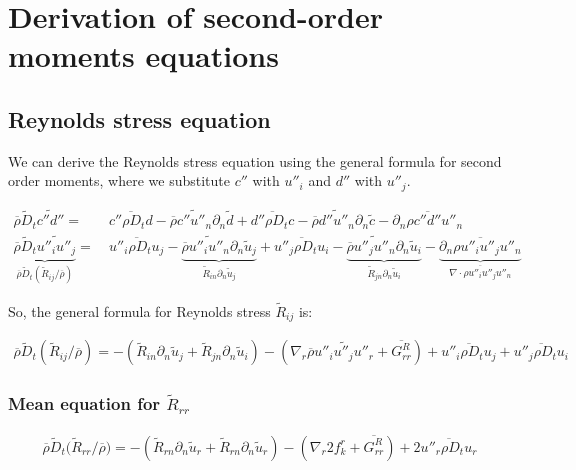 \documentclass[10pt,paper=a4]{report}
\newcommand{\eht}{\overline}
\newcommand{\fht}{\widetilde}
\begin{document}
\section{Derivation of second-order moments equations}

\subsection{Reynolds stress equation}

We can derive the Reynolds stress equation using the general formula for second order moments, where we substitute $c''$ with $u''_i$ and $d''$ with $u''_j$.

\begin{align}
\overline{\rho}\widetilde{D}_t \widetilde{c''d''} = & \ \overline{c'' \rho D_t d} - \overline{\rho} \widetilde{c''u''_n}\partial_n \widetilde{d} + \overline{d'' \rho D_t c} - \overline{\rho} \widetilde{d''u''_n}\partial_n \widetilde{c} - \overline{\partial_n \rho c''d''u''_n} \\
\underbrace{\eht{\rho}\fht{D}_t \fht{u''_i u''_j}}_\text{$\eht{\rho}\fht{D}_t (\fht{R}_{ij} / \eht{\rho})$} = & \ \eht{u''_i \rho D_t u_j} - \underbrace{\eht{\rho} \fht{u''_i u''_n} \partial_n \fht{u}_j}_\text{$\fht{R}_{in}\partial_n \fht{u}_j$} + \eht{u''_j \rho D_t u_i} - \underbrace{\eht{\rho} \fht{u''_j u''_n} \partial_n \fht{u}_i}_\text{$\fht{R}_{jn}\partial_n \fht{u}_i$} - \underbrace{\eht{\partial_n \rho u''_i u''_j u''_n}}_\text{$\eht{\nabla \cdot \rho u''_i u''_j u''_n}$}
\end{align}

\noindent
So, the general formula for Reynolds stress $\fht{R}_{ij}$ is:

\begin{align}
\eht{\rho}\fht{D}_t (\fht{R}_{ij} / \eht{\rho}) = -\left(\fht{R}_{in}\partial_n \fht{u}_j + \fht{R}_{jn}\partial_n \fht{u}_i \right) -\left( \nabla_r \eht{\rho}\fht{u''_i u''_j u''_r} + \eht{G_{rr}^R} \right) + \eht{u''_i \rho D_t u_j} + \eht{u''_j \rho D_t u_i} 
\end{align}

\subsubsection{Mean equation for $\fht{R}_{rr}$}

\begin{align}
\eht{\rho}\fht{D}_t \big( \fht{R}_{rr} / \eht{\rho} \big) = -\left(\fht{R}_{rn}\partial_n \fht{u}_r + \fht{R}_{rn}\partial_n \fht{u}_r \right) -\left( \nabla_r 2 f_k^r + \eht{G_{rr}^R} \right) + 2  \eht{u''_r \rho D_t u_r} 
\end{align}
\end{document}
